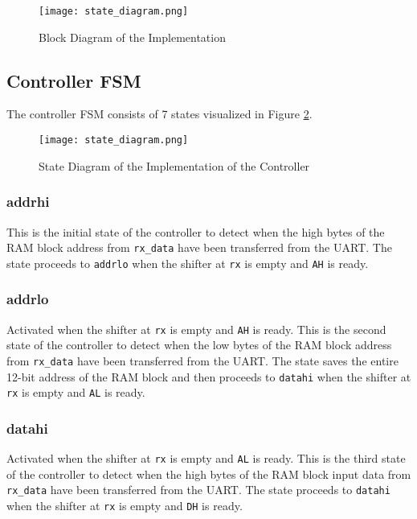 \documentclass[paper=usletter, fontsize=12pt]{article}
\begin{document}
        \begin{figure}[ht]
            \begin{center}
                \texttt{[image: state\_diagram.png]}
                \caption{Block Diagram of the Implementation}
                \label{fig:block}
            \end{center}
        \end{figure}

        \subsection{Controller FSM} The controller FSM consists of 7 states
        visualized in Figure \ref{fig:states}.

            \begin{figure}[ht]
                \begin{center}
                    \texttt{[image: state\_diagram.png]}
                    \caption{State Diagram of the Implementation of the
                    Controller}
                    \label{fig:states}
                \end{center}
            \end{figure}

            \subsubsection{addrhi} This is the initial state of the controller
            to detect when the high bytes of the RAM block address from
            \texttt{rx\_data} have been transferred from the UART. The state
            proceeds to \texttt{addrlo} when the shifter at \texttt{rx} is
            empty and \texttt{AH} is ready.

            \subsubsection{addrlo} Activated when the shifter at \texttt{rx} is
            empty and \texttt{AH} is ready. This is the second state of the
            controller to detect when the low bytes of the RAM block address
            from \texttt{rx\_data} have been transferred from the UART. The
            state saves the entire 12-bit address of the RAM block and then
            proceeds to \texttt{datahi} when the shifter at \texttt{rx} is
            empty and \texttt{AL} is ready.

            \subsubsection{datahi} Activated when the shifter at \texttt{rx} is
            empty and \texttt{AL} is ready. This is the third state of the
            controller to detect when the high bytes of the RAM block input
            data from \texttt{rx\_data} have been transferred from the UART.
            The state proceeds to \texttt{datahi} when the shifter at
            \texttt{rx} is empty and \texttt{DH} is ready.
\end{document}
